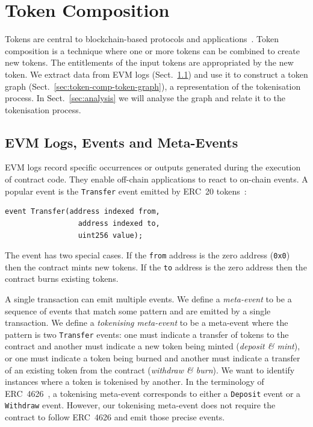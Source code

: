 \section{Token Composition}\label{sec:token-composition}

Tokens are central to blockchain-based protocols and
applications~\cite{voshmgir-20}.  Token composition is a technique
where one or more tokens can be combined to create new tokens.  The
entitlements of the input tokens are appropriated by the new token.
We extract data from EVM logs (Sect.~\ref{sec:token-comp-evm-logs})
and use it to construct a token graph
(Sect.~\ref{sec:token-comp-token-graph}), a representation of the
tokenisation process.  In Sect.~\ref{sec:analysis} we will analyse the
graph and relate it to the tokenisation process.

\subsection{EVM Logs, Events and Meta-Events}\label{sec:token-comp-evm-logs}

EVM logs record specific occurrences or outputs generated during the
execution of contract code.  They enable off-chain applications to
react to on-chain events.  A popular event is the \texttt{Transfer}
event emitted by ERC~20 tokens~\cite{vogelsteller-buterin-15}:

\begin{lstlisting}[language=Solidity,numbers=none,
    caption={The ERC~20 \texttt{Transfer} event specifies three
      parameters: \texttt{from}, \texttt{to}, and \texttt{value}.}]
  event Transfer(address indexed from,
                 address indexed to,
                 uint256 value);
\end{lstlisting}

The event has two special cases.  If the \texttt{from} address is the
zero address (\texttt{0x0}) then the contract mints new tokens.  If
the \texttt{to} address is the zero address then the contract burns
existing tokens.

A single transaction can emit multiple events.  We define a
\textit{meta-event} to be a sequence of events that match some pattern
and are emitted by a single transaction.  We define a
\textit{tokenising meta-event} to be a meta-event where the pattern is
two \texttt{Transfer} events: one must indicate a transfer of tokens
to the contract and another must indicate a new token being minted
(\textit{deposit \& mint}), or one must indicate a token being burned
and another must indicate a transfer of an existing token from the
contract (\textit{withdraw \& burn}).  We want to identify instances
where a token is tokenised by another.  In the terminology of
ERC~4626~\cite{santoro-et-al-22}, a tokenising meta-event corresponds
to either a \texttt{Deposit} event or a \texttt{Withdraw} event.
However, our tokenising meta-event does not require the contract to
follow ERC~4626 and emit those precise events.

